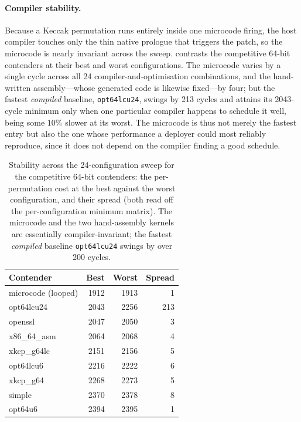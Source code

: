 \paragraph{Compiler stability.}
Because a Keccak permutation runs entirely inside one microcode firing, the host
compiler touches only the thin native prologue that triggers the patch, so the
microcode is nearly invariant across the sweep. 
contrasts the competitive 64-bit contenders at their best and worst
configurations. The microcode varies by a single cycle across all 24
compiler-and-optimisation combinations, and the hand-written assembly---whose
generated code is likewise fixed---by four; but the fastest \emph{compiled}
baseline, \texttt{opt64lcu24}, swings by 213 cycles and attains its 2043-cycle
minimum only when one particular compiler happens to schedule it well, being some
$10\%$ slower at its worst. The microcode is thus not merely the fastest entry but
also the one whose performance a deployer could most reliably reproduce, since it
does not depend on the compiler finding a good schedule.

\begin{table}[t]
\centering
\caption{Stability across the 24-configuration sweep for the competitive 64-bit
contenders: the per-permutation cost at the best against the worst configuration,
and their spread (both read off the per-configuration minimum matrix). The
microcode and the two hand-assembly kernels are essentially compiler-invariant;
the fastest \emph{compiled} baseline \texttt{opt64lcu24} swings by over 200
cycles.}
\label{tab:results-keccak-stab}
\small
\begin{tabular}{@{}lrrr@{}}
\toprule
Contender & Best & Worst & Spread \\
\midrule
microcode (looped) & 1912 & 1913 & 1   \\
opt64lcu24         & 2043 & 2256 & 213 \\
openssl            & 2047 & 2050 & 3   \\
x86\_64\_asm       & 2064 & 2068 & 4   \\
xkcp\_g64lc        & 2151 & 2156 & 5   \\
opt64lcu6          & 2216 & 2222 & 6   \\
xkcp\_g64          & 2268 & 2273 & 5   \\
simple             & 2370 & 2378 & 8   \\
opt64u6            & 2394 & 2395 & 1   \\
\bottomrule
\end{tabular}
\end{table}

